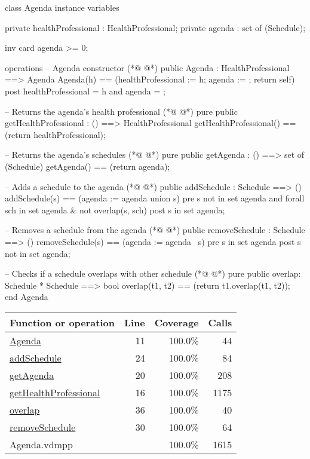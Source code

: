 \begin{vdmpp}[breaklines=true]
class Agenda
instance variables

private healthProfessional : HealthProfessional;
private agenda : set of (Schedule);

inv card agenda >= 0;

operations
 -- Agenda constructor
(*@
\label{Agenda:11}
@*)
 public Agenda : HealthProfessional ==> Agenda
  Agenda(h) == (healthProfessional := h; agenda := {}; return self)
 post healthProfessional = h and agenda = {};
 
 -- Returns the agenda's health professional
(*@
\label{getHealthProfessional:16}
@*)
 pure public getHealthProfessional : () ==> HealthProfessional
  getHealthProfessional() == (return healthProfessional);
 
 -- Returns the agenda's schedules
(*@
\label{getAgenda:20}
@*)
 pure public getAgenda : () ==> set of (Schedule)
  getAgenda() == (return agenda);
 
 -- Adds a schedule to the agenda
(*@
\label{addSchedule:24}
@*)
 public addSchedule : Schedule ==> ()
  addSchedule(s) == (agenda := agenda union {s})
 pre s not in set agenda and forall sch in set agenda & not overlap(s, sch)
 post s in set agenda;
 
 -- Removes a schedule from the agenda
(*@
\label{removeSchedule:30}
@*)
 public removeSchedule : Schedule ==> ()
  removeSchedule(s) == (agenda := agenda \ {s})
 pre s in set agenda
 post s not in set agenda;
 
 -- Checks if a schedule overlaps with other schedule
(*@
\label{overlap:36}
@*)
 pure public overlap: Schedule * Schedule ==> bool
  overlap(t1, t2) == (return t1.overlap(t1, t2));
end Agenda
\end{vdmpp}
\bigskip
\begin{longtable}{|l|r|r|r|}
\hline
Function or operation & Line & Coverage & Calls \\
\hline
\hline
\hyperref[Agenda:11]{Agenda} & 11&100.0\% & 44 \\
\hline
\hyperref[addSchedule:24]{addSchedule} & 24&100.0\% & 84 \\
\hline
\hyperref[getAgenda:20]{getAgenda} & 20&100.0\% & 208 \\
\hline
\hyperref[getHealthProfessional:16]{getHealthProfessional} & 16&100.0\% & 1175 \\
\hline
\hyperref[overlap:36]{overlap} & 36&100.0\% & 40 \\
\hline
\hyperref[removeSchedule:30]{removeSchedule} & 30&100.0\% & 64 \\
\hline
\hline
Agenda.vdmpp & & 100.0\% & 1615 \\
\hline
\end{longtable}

